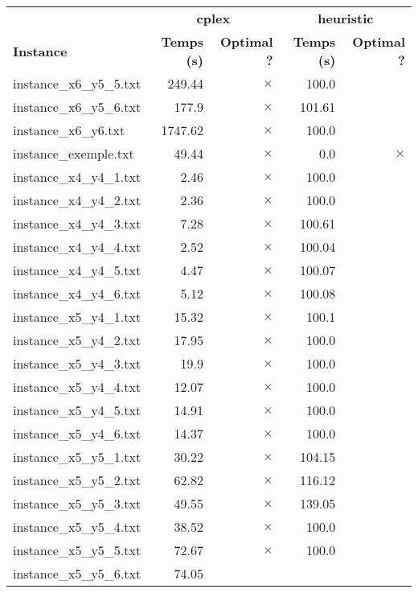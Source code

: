 \documentclass{article}
\begin{document}
\newpage
\begin{center}
\renewcommand{\arraystretch}{1.4} 
 \begin{tabular}{lrrrr}
	\hline
 & \multicolumn{2}{c}{\textbf{cplex}} & \multicolumn{2}{c}{\textbf{heuristic}}\\
\textbf{Instance}  & \textbf{Temps (s)} & \textbf{Optimal ?}  & \textbf{Temps (s)} & \textbf{Optimal ?} \\\hline

instance\_x6\_y5\_5.txt & 249.44 & 
$\times$
 & 100.0 & 
\\
instance\_x6\_y5\_6.txt & 177.9 & 
$\times$
 & 101.61 & 
\\
instance\_x6\_y6.txt & 1747.62 & 
$\times$
 & 100.0 & 
\\
instance\_exemple.txt & 49.44 & 
$\times$
 & 0.0 & 
$\times$
\\
instance\_x4\_y4\_1.txt & 2.46 & 
$\times$
 & 100.0 & 
\\
instance\_x4\_y4\_2.txt & 2.36 & 
$\times$
 & 100.0 & 
\\
instance\_x4\_y4\_3.txt & 7.28 & 
$\times$
 & 100.61 & 
\\
instance\_x4\_y4\_4.txt & 2.52 & 
$\times$
 & 100.04 & 
\\
instance\_x4\_y4\_5.txt & 4.47 & 
$\times$
 & 100.07 & 
\\
instance\_x4\_y4\_6.txt & 5.12 & 
$\times$
 & 100.08 & 
\\
instance\_x5\_y4\_1.txt & 15.32 & 
$\times$
 & 100.1 & 
\\
instance\_x5\_y4\_2.txt & 17.95 & 
$\times$
 & 100.0 & 
\\
instance\_x5\_y4\_3.txt & 19.9 & 
$\times$
 & 100.0 & 
\\
instance\_x5\_y4\_4.txt & 12.07 & 
$\times$
 & 100.0 & 
\\
instance\_x5\_y4\_5.txt & 14.91 & 
$\times$
 & 100.0 & 
\\
instance\_x5\_y4\_6.txt & 14.37 & 
$\times$
 & 100.0 & 
\\
instance\_x5\_y5\_1.txt & 30.22 & 
$\times$
 & 104.15 & 
\\
instance\_x5\_y5\_2.txt & 62.82 & 
$\times$
 & 116.12 & 
\\
instance\_x5\_y5\_3.txt & 49.55 & 
$\times$
 & 139.05 & 
\\
instance\_x5\_y5\_4.txt & 38.52 & 
$\times$
 & 100.0 & 
\\
instance\_x5\_y5\_5.txt & 72.67 & 
$\times$
 & 100.0 & 
\\
instance\_x5\_y5\_6.txt & 74.05 & 

\end{tabular}
\end{center}
\end{document}
